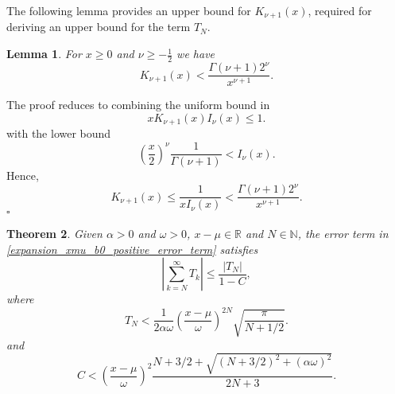 \documentclass[10pt,a4paper,oneside]{article}
\newtheorem{theorem}{Theorem}[section]
\newtheorem{lemma}[theorem]{Lemma}
\newenvironment{proof}{\noindent{\bf Proof:}}{\hfill$\square$}
\numberwithin{equation}{section}
\begin{document}
The following lemma provides an upper bound for $K_{\nu+1}(x)$, required for deriving an upper bound for the term $T_N$.
\begin{lemma}\label{lemma_1}
For $x \ge 0$ and $\nu \ge -\frac{1}{2}$ we have
\begin{equation}
K_{\nu + 1}(x) < \frac{\Gamma(\nu + 1)2^{\nu}}{x^{\nu + 1}}.
\end{equation}
\end{lemma}
\begin{proof}
The proof reduces to combining the uniform bound in \cite{Gaunt2016}
\begin{equation}
x K_{\nu + 1}(x) I_{\nu}(x) \le 1.
\end{equation}
with the lower bound \cite{Luke1972}
\begin{equation}
\left(\frac{x}{2}\right)^{\nu}\frac{1}{\Gamma(\nu + 1)} < I_{\nu}(x).
\end{equation}
Hence,
\begin{equation}
K_{\nu + 1}(x) \le \frac{1}{x I_{\nu}(x)} < \frac{\Gamma(\nu + 1)2^{\nu}}{x^{\nu + 1}}.
\end{equation}
\end{proof}

\begin{theorem}
Given $\alpha > 0$ and $\omega > 0$, $x-\mu \in \mathbb{R}$ and $N \in \mathbb{N}$, the error term in \eqref{expansion_xmu_b0_positive_error_term} satisfies
\begin{equation}\label{bound_remainder_xmu_b0_positive}
\left|\sum_{k=N}^{\infty} T_k \right| \le \frac{|T_N|}{1 - C},
\end{equation}
where
\begin{equation}\label{bound_TN_xmu_b0_positive}
T_N < \frac{1}{2\alpha\omega}\left(\frac{x-\mu}{\omega}\right)^{2N} \sqrt{\frac{\pi}{N + 1/2}}.
\end{equation}
and
\begin{equation}
C < \left(\frac{x-\mu}{\omega}\right)^2 \frac{N + 3/2 + \sqrt{(N + 3/2)^2 + (\alpha\omega)^2}}{2N + 3}.
\end{equation}
\end{theorem}
\end{document}
